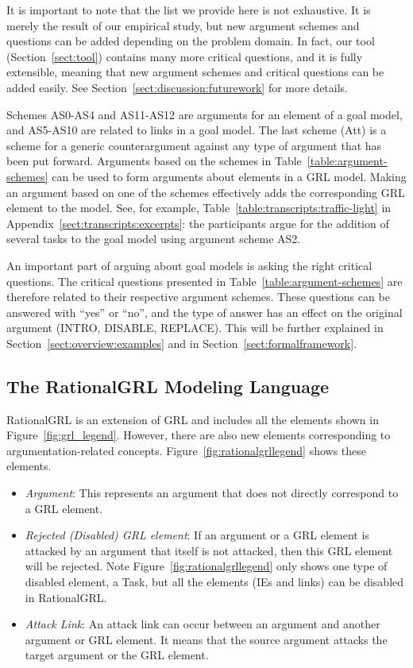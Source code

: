It is important to note that the list we provide here is not exhaustive. It is merely the result of our empirical study, but new argument schemes and questions can be added depending on the problem domain. In fact, our tool (Section~\ref{sect:tool}) contains many more critical questions, and it is fully extensible, meaning that new argument schemes and critical questions can be added easily. See Section~\ref{sect:discussion:futurework} for more details.

Schemes AS0-AS4 and AS11-AS12 are arguments for an element of a goal model, and AS5-AS10 are related to links in a goal model. The last scheme (Att) is a scheme for a generic counterargument against any type of argument that has been put forward. Arguments based on the schemes in Table~\ref{table:argument-schemes} can be used to form arguments about elements in a GRL model. Making an argument based on one of the schemes effectively adds the corresponding GRL element to the model. See, for example, Table~\ref{table:transcripts:traffic-light} in Appendix~\ref{sect:transcripts:excerpts}: the participants argue for the addition of several tasks to the goal model using argument scheme AS2. 

An important part of arguing about goal models is asking the right critical questions. The critical questions presented in Table~\ref{table:argument-schemes} are therefore related to their respective argument schemes. These questions can be answered with ``yes'' or ``no'', and the type of answer has an effect on the original argument (\textsf{INTRO}, \textsf{DISABLE}, \textsf{REPLACE}). This will be further explained in Section~\ref{sect:overview:examples} and in Section~\ref{sect:formalframework}.


\subsection{The RationalGRL Modeling Language}
\label{sect:overview:lang}
\label{sect:metamodel}
RationalGRL is an extension of GRL and includes all the elements shown in Figure~\ref{fig:grl_legend}. However, there are also new elements corresponding to argumentation-related concepts. Figure~\ref{fig:rationalgrllegend} shows these elements. 
\begin{itemize}
\item \emph{Argument}: This represents an argument that does not directly correspond to a GRL element.  
\item \emph{Rejected (Disabled) GRL element}: If an argument or a GRL element is attacked by an argument that itself is not attacked, then this GRL element will be rejected. Note Figure~\ref{fig:rationalgrllegend} only shows one type of disabled element, a Task, but all the elements (IEs and links) can be disabled in RationalGRL.
\item \emph{Attack Link}: An attack link can occur between an argument and another argument or GRL element. It means that the source argument attacks the target argument or the GRL element.
\end{itemize} 

